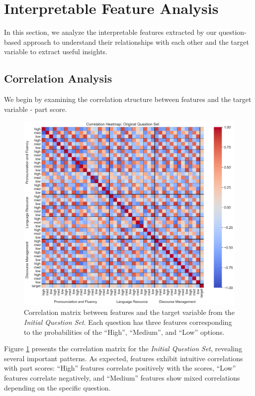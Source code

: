 \documentclass{report}
\begin{document}
\section{Interpretable Feature Analysis}
\label{sec:interpretable_feature_analysis}
In this section, we analyze the interpretable features extracted by our question-based approach to understand their relationships with each other and the target variable to extract useful insights.

\subsection{Correlation Analysis}
\label{subsec:correlation_analysis}
We begin by examining the correlation structure between features and the target variable - part score.

\begin{figure}[h]
  \centering
  \includegraphics[width=1\linewidth]{images/correlation_matrix_original.png}
  \caption{Correlation matrix between features and the target variable from the \emph{Initial Question Set}. Each question has three features corresponding to the probabilities of the ``High'', ``Medium'', and ``Low'' options.}
  \label{fig:correlation_matrix_original}
\end{figure}

Figure \ref{fig:correlation_matrix_original} presents the correlation matrix for the \emph{Initial Question Set}, revealing several important patterns. As expected, features exhibit intuitive correlations with part scores: ``High'' features correlate positively with the scores, ``Low'' features correlate negatively, and ``Medium'' features show mixed correlations depending on the specific question. 
\end{document}

